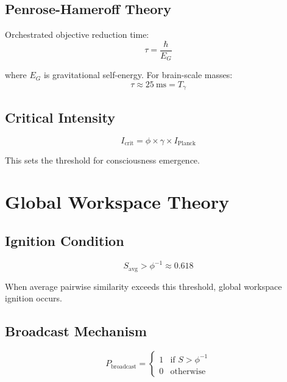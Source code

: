 \documentclass[12pt,a4paper]{article}
\begin{document}
\subsection{Penrose-Hameroff Theory}

Orchestrated objective reduction time:
\begin{equation}
\tau = \frac{\hbar}{E_G}
\end{equation}

where $E_G$ is gravitational self-energy. For brain-scale masses:
\begin{equation}
\tau \approx 25~\text{ms} = T_\gamma
\end{equation}

\subsection{Critical Intensity}

\begin{equation}
I_{\text{crit}} = \phi \times \gamma \times I_{\text{Planck}}
\end{equation}

This sets the threshold for consciousness emergence.

\section{Global Workspace Theory}

\subsection{Ignition Condition}

\begin{equation}
S_{\text{avg}} > \phi^{-1} \approx 0.618
\end{equation}

When average pairwise similarity exceeds this threshold, global workspace ignition occurs.

\subsection{Broadcast Mechanism}

\begin{equation}
P_{\text{broadcast}} = \begin{cases}
1 & \text{if } S > \phi^{-1} \\
0 & \text{otherwise}
\end{cases}
\end{equation}
\end{document}
